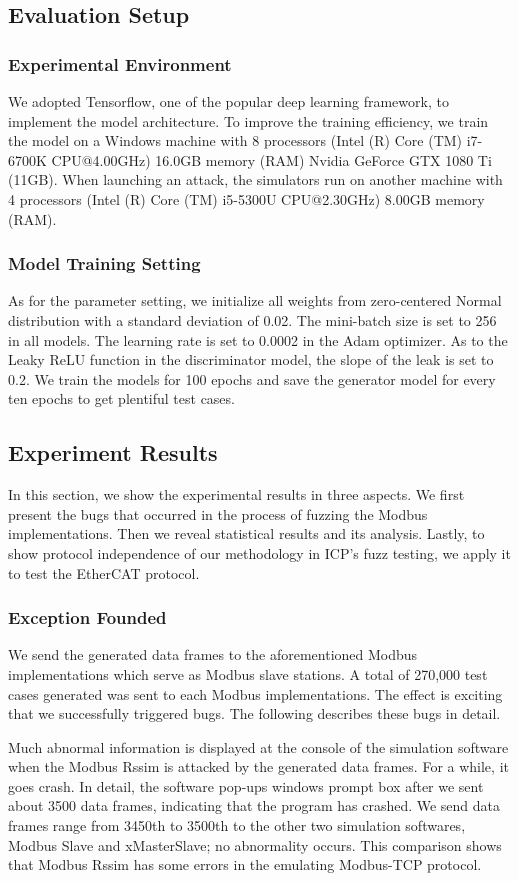 \subsection{Evaluation Setup}
\subsubsection{Experimental Environment}
We adopted Tensorflow, one of the popular deep learning framework, to implement the model architecture. To improve the training efficiency, we train the model on a Windows machine with 8 processors (Intel (R) Core (TM) i7-6700K CPU@4.00GHz) 16.0GB memory (RAM) Nvidia GeForce GTX 1080 Ti (11GB). When launching an attack, the simulators run on another machine with 4 processors (Intel (R) Core (TM) i5-5300U CPU@2.30GHz) 8.00GB memory (RAM).
\subsubsection{Model Training Setting}
As for the parameter setting, we initialize all weights from zero-centered Normal distribution with a standard deviation of 0.02. The mini-batch size is set to 256 in all models. The learning rate is set to 0.0002 in the Adam optimizer. As to the Leaky ReLU function in the discriminator model, the slope of the leak is set to 0.2. We train the models for 100 epochs and save the generator model for every ten epochs to get plentiful test cases.

\subsection{Experiment Results}
In this section, we show the experimental results in three aspects. We first present the bugs that occurred in the process of fuzzing the Modbus implementations. Then we reveal statistical results and its analysis. Lastly, to show protocol independence of our methodology in ICP’s fuzz testing, we apply it to test the EtherCAT protocol.
\subsubsection{Exception Founded}
We send the generated data frames to the aforementioned Modbus implementations which serve as Modbus slave stations. A total of 270,000 test cases generated was sent to each Modbus implementations. The effect is exciting that we successfully triggered bugs. The following describes these bugs in detail.

Much abnormal information is displayed at the console of the simulation software when the Modbus Rssim is attacked by the generated data frames. For a while, it goes crash. In detail, the software pop-ups windows prompt box after we sent about 3500 data frames, indicating that the program has crashed. We send data frames range from 3450th to 3500th to the other two simulation softwares, Modbus Slave and xMasterSlave; no abnormality occurs. This comparison shows that Modbus Rssim has some errors in the emulating Modbus-TCP protocol.

